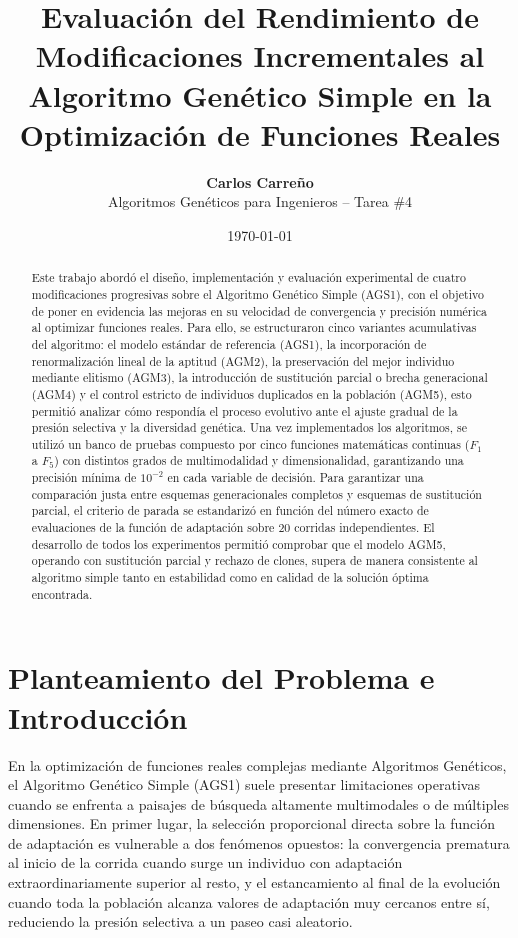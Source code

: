 \documentclass[11pt,letterpaper]{article}
\title{\textbf{Evaluación del Rendimiento de Modificaciones Incrementales al Algoritmo Genético Simple en la Optimización de Funciones Reales}}
\author{\textbf{Carlos Carreño} \\ Algoritmos Genéticos para Ingenieros -- Tarea \#4}
\date{\today}
\begin{document}
\maketitle

\begin{abstract}
\noindent Este trabajo abordó el diseño, implementación y evaluación experimental de cuatro modificaciones progresivas sobre el Algoritmo Genético Simple (AGS1), con el objetivo de poner en evidencia las mejoras en su velocidad de convergencia y precisión numérica al optimizar funciones reales. Para ello, se estructuraron cinco variantes acumulativas del algoritmo: el modelo estándar de referencia (AGS1), la incorporación de renormalización lineal de la aptitud (AGM2), la preservación del mejor individuo mediante elitismo (AGM3), la introducción de sustitución parcial o brecha generacional (AGM4) y el control estricto de individuos duplicados en la población (AGM5), esto permitió analizar cómo respondía el proceso evolutivo ante el ajuste gradual de la presión selectiva y la diversidad genética. Una vez implementados los algoritmos, se utilizó un banco de pruebas compuesto por cinco funciones matemáticas continuas ($F_1$ a $F_5$) con distintos grados de multimodalidad y dimensionalidad, garantizando una precisión mínima de $10^{-2}$ en cada variable de decisión. Para garantizar una comparación justa entre esquemas generacionales completos y esquemas de sustitución parcial, el criterio de parada se estandarizó en función del número exacto de evaluaciones de la función de adaptación sobre $20$ corridas independientes. El desarrollo de todos los experimentos permitió comprobar que el modelo AGM5, operando con sustitución parcial y rechazo de clones, supera de manera consistente al algoritmo simple tanto en estabilidad como en calidad de la solución óptima encontrada.
\end{abstract}

\section{Planteamiento del Problema e Introducción}
En la optimización de funciones reales complejas mediante Algoritmos Genéticos, el Algoritmo Genético Simple (AGS1) suele presentar limitaciones operativas cuando se enfrenta a paisajes de búsqueda altamente multimodales o de múltiples dimensiones. En primer lugar, la selección proporcional directa sobre la función de adaptación es vulnerable a dos fenómenos opuestos: la convergencia prematura al inicio de la corrida cuando surge un individuo con adaptación extraordinariamente superior al resto, y el estancamiento al final de la evolución cuando toda la población alcanza valores de adaptación muy cercanos entre sí, reduciendo la presión selectiva a un paseo casi aleatorio.
\end{document}
